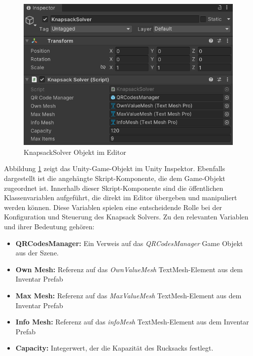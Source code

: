 \begin{itemize}
\begin{figure}[H]
    \centering
    \includegraphics[scale=0.7]{images/knapsackEditor}
    \caption{KnapsackSolver Objekt im Editor}
    \label{fig:Knapsack_Editor}
\end{figure}

Abbildung \ref{fig:Knapsack_Editor} zeigt das Unity-Game-Objekt im Unity Inspektor. Ebenfalls dargestellt ist die angehängte
Skript-Komponente, die dem Game-Objekt zugeordnet ist. Innerhalb dieser Skript-Komponente sind die öffentlichen Klassenvariablen
aufgeführt, die direkt im Editor übergeben und manipuliert werden können. Diese Variablen spielen eine entscheidende Rolle
bei der Konfiguration und Steuerung des Knapsack Solvers. Zu den relevanten Variablen und ihrer Bedeutung gehören:
\begin{itemize}
    \item \textbf{QRCodesManager:} Ein Verweis auf das \textit{QRCodesManager} Game Objekt aus der Szene.

    \item \textbf{Own Mesh:} Referenz auf das \textit{OwnValueMesh} TextMesh-Element aus dem Inventar Prefab

    \item \textbf{Max Mesh:} Referenz auf das \textit{MaxValueMesh} TextMesh-Element aus dem Inventar Prefab

    \item \textbf{Info Mesh:} Referenz auf das \textit{infoMesh} TextMesh-Element aus dem Inventar Prefab

    \item \textbf{Capacity:} Integerwert, der die Kapazität des Rucksacks festlegt.


\end{itemize}
\end{itemize}
